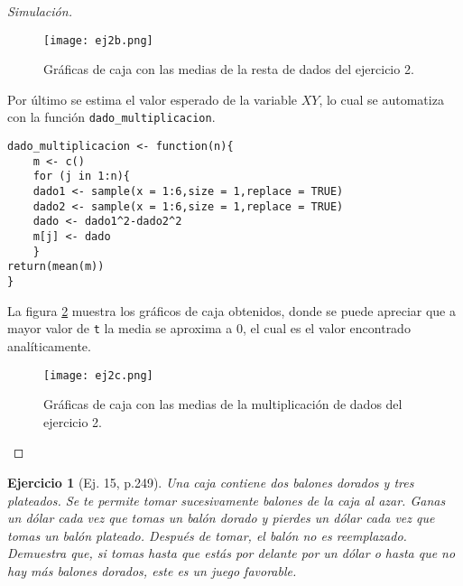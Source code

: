 \documentclass[12pt,letterpaper]{article}
\newtheorem{ej}{Ejercicio}
\begin{document}
\begin{proof}[Simulación]
\begin{figure}
 	\centering 
 		\texttt{[image: ej2b.png]} 		
 	 	\caption{Gráficas de caja con las medias de la resta de dados del ejercicio 2.} 
 	 		\label{ej2b}
\end{figure}
Por último se estima el valor esperado de la variable $XY$, lo cual se automatiza con la función \texttt{dado\_multiplicacion}.
\begin{lstlisting}
dado_multiplicacion <- function(n){
    m <- c()
    for (j in 1:n){
    dado1 <- sample(x = 1:6,size = 1,replace = TRUE)
    dado2 <- sample(x = 1:6,size = 1,replace = TRUE)
    dado <- dado1^2-dado2^2
    m[j] <- dado
    }
return(mean(m))
}
\end{lstlisting}
La figura \ref{ej2c} muestra los gráficos de caja obtenidos, donde se puede apreciar que a mayor valor de \texttt{t} la media se aproxima a 0, el cual es el valor encontrado analíticamente.
\begin{figure}
 	\centering 
 		\texttt{[image: ej2c.png]} 		
 	 	\caption{Gráficas de caja con las medias de la multiplicación de dados del ejercicio 2.} 
 	 		\label{ej2c}
\end{figure}

\end{proof}


\begin{ej}[Ej. 15, p.249]
Una caja contiene dos balones dorados y tres plateados. Se te permite tomar sucesivamente balones de la caja al azar. Ganas un dólar cada vez que tomas un balón dorado y pierdes un dólar cada vez que tomas un balón plateado. Después de tomar, el balón no es reemplazado. Demuestra que, si tomas hasta que estás por delante por un dólar o hasta que no hay más balones dorados, este es un juego favorable.
\end{ej}
\end{document}

